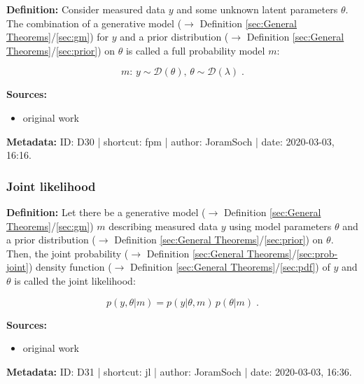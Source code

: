 \documentclass[a4paper,12pt,twoside]{book}
\begin{document}
\textbf{Definition:} Consider measured data $y$ and some unknown latent parameters $\theta$. The combination of a generative model ($\rightarrow$ Definition \ref{sec:General Theorems}/\ref{sec:gm}) for $y$ and a prior distribution ($\rightarrow$ Definition \ref{sec:General Theorems}/\ref{sec:prior}) on $\theta$ is called a full probability model $m$:

\begin{equation} \label{eq:fpm-fpm}
m: \, y \sim \mathcal{D}(\theta), \, \theta \sim \mathcal{D}(\lambda) \; .
\end{equation}


\vspace{1em}
\textbf{Sources:}
\begin{itemize}
\item original work\end{itemize}


\vspace{1em}
\textbf{Metadata:} ID: D30 | shortcut: fpm | author: JoramSoch | date: 2020-03-03, 16:16.
\vspace{1em}



\subsubsection[\textit{Joint likelihood}]{Joint likelihood} \label{sec:jl}
\setcounter{equation}{0}

\textbf{Definition:} Let there be a generative model ($\rightarrow$ Definition \ref{sec:General Theorems}/\ref{sec:gm}) $m$ describing measured data $y$ using model parameters $\theta$ and a prior distribution ($\rightarrow$ Definition \ref{sec:General Theorems}/\ref{sec:prior}) on $\theta$. Then, the joint probability ($\rightarrow$ Definition \ref{sec:General Theorems}/\ref{sec:prob-joint}) density function ($\rightarrow$ Definition \ref{sec:General Theorems}/\ref{sec:pdf}) of $y$ and $\theta$ is called the joint likelihood:

\begin{equation} \label{eq:jl-jl}
p(y,\theta|m) = p(y|\theta,m) \, p(\theta|m) \; .
\end{equation}


\vspace{1em}
\textbf{Sources:}
\begin{itemize}
\item original work\end{itemize}


\vspace{1em}
\textbf{Metadata:} ID: D31 | shortcut: jl | author: JoramSoch | date: 2020-03-03, 16:36.
\vspace{1em}
\end{document}
